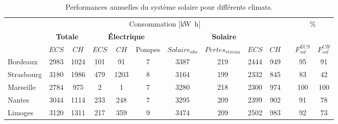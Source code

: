 \begin{table}
\small
\centering
\caption{Performances annuelles du système solaire pour différents climats.}
\label{tab:performance_annuelles}
\begin{tabular}{l c c c c c c c c c c c c}
    \toprule
               &   \multicolumn{9}{c}{Consommation [\si{\kilo\watt\hour}]} & & \multicolumn{2}{c}{\multirow{2}{*}{\si{\percent}}} \\
    \cmidrule(r){2-10}
               & \multicolumn{2}{c}{\textbf{Totale}} &  \multicolumn{3}{c}{\textbf{Électrique}}  & \multicolumn{4}{c}{\textbf{Solaire}} & \\
    \cmidrule(r){2-3}
    \cmidrule(r){4-6}
    \cmidrule(r){7-10}
    \cmidrule(r){12-13}
               & $ECS$    & $CH$      &  $ECS$        & $CH$ & Pompes    & $Solaire_{abs}$  & $Pertes_{réseau}$ & $ECS$  & $CH$ & & $F_{sol}^{ECS}$  & $F_{sol}^{CH}$ \\
    \midrule
    Bordeaux   & \num{2983}     & \num{1024}      &  \num{101}          & \num{91}          &  \num{7}                 & \num{3387}                  & \num{219}       & \num{2444}   &  \num{949}    &   & \num{95}         & \num{91}  \\
    Strasbourg & \num{3180}     & \num{1986}      &  \num{479}          & \num{1203}        &  \num{8}                 & \num{3164}                  & \num{199}       & \num{2332}   &  \num{845}    &   & \num{83}         & \num{42}  \\
    Marseille  & \num{2784}     & \num{975}       &  \num{2}            & \num{1}           &  \num{7}                 & \num{3280}                  & \num{218}       & \num{2300}   &  \num{974}    &   & \num{100}        & \num{100} \\
    Nantes     & \num{3044}     & \num{1114}      &  \num{233}          & \num{248}         &  \num{7}                 & \num{3295}                  & \num{209}       & \num{2399}   &  \num{902}    &   & \num{91}         & \num{78}  \\
    Limoges    & \num{3120}     & \num{1311}      &  \num{217}          & \num{359}         &  \num{9}                 & \num{3474}                  & \num{209}       & \num{2502}   &  \num{983}    &   & \num{92}         & \num{73}  \\
    \bottomrule
\end{tabular}
\end{table}

